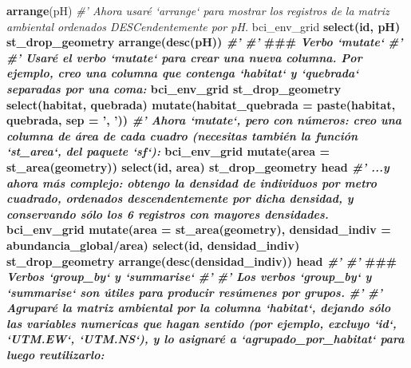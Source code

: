 \documentclass[11pt,]{article}
\newenvironment{Shaded}{\begin{snugshade}}{\end{snugshade}}
\newcommand{\KeywordTok}[1]{\textcolor[rgb]{0.13,0.29,0.53}{\textbf{#1}}}
\newcommand{\DataTypeTok}[1]{\textcolor[rgb]{0.13,0.29,0.53}{#1}}
\newcommand{\StringTok}[1]{\textcolor[rgb]{0.31,0.60,0.02}{#1}}
\newcommand{\CommentTok}[1]{\textcolor[rgb]{0.56,0.35,0.01}{\textit{#1}}}
\newcommand{\OperatorTok}[1]{\textcolor[rgb]{0.81,0.36,0.00}{\textbf{#1}}}
\newcommand{\AlertTok}[1]{\textcolor[rgb]{0.94,0.16,0.16}{#1}}
\newcommand{\NormalTok}[1]{#1}
\begin{document}
\begin{Shaded}
\begin{Highlighting}[]
{{{{{{{{{{{{{{{{{{{{{{{{{{{{{{{\StringTok{  }\KeywordTok{arrange}\NormalTok{(pH)}
\CommentTok{#' Ahora usaré `arrange` para mostrar los registros de la matriz ambiental ordenados DESCendentemente por pH.}
\NormalTok{bci_env_grid }\OperatorTok{%
\StringTok{  }\KeywordTok{select}\NormalTok{(id, pH) }\OperatorTok{%
\StringTok{  }\NormalTok{st_drop_geometry }\OperatorTok{%
\StringTok{  }\KeywordTok{arrange}\NormalTok{(}\KeywordTok{desc}\NormalTok{(pH))}
\CommentTok{#' }
\CommentTok{#' }\AlertTok{###}\CommentTok{ Verbo `mutate`}
\CommentTok{#' }
\CommentTok{#' Usaré el verbo `mutate` para crear una nueva columna. Por ejemplo, creo una columna que contenga `habitat` y `quebrada` separadas por una coma:}
\NormalTok{bci_env_grid }\OperatorTok{%
\StringTok{  }\NormalTok{st_drop_geometry }\OperatorTok{%
\StringTok{  }\KeywordTok{select}\NormalTok{(habitat, quebrada) }\OperatorTok{%
\StringTok{  }\KeywordTok{mutate}\NormalTok{(}\DataTypeTok{habitat_quebrada =} \KeywordTok{paste}\NormalTok{(habitat, quebrada, }\DataTypeTok{sep =} \StringTok{', '}\NormalTok{))}
\CommentTok{#' Ahora `mutate`, pero con números: creo una columna de área de cada cuadro (necesitas también la función `st_area`, del paquete `sf`):}
\NormalTok{bci_env_grid }\OperatorTok{%
\StringTok{  }\KeywordTok{mutate}\NormalTok{(}\DataTypeTok{area =} \KeywordTok{st_area}\NormalTok{(geometry)) }\OperatorTok{%
\StringTok{  }\KeywordTok{select}\NormalTok{(id, area) }\OperatorTok{%
\StringTok{  }\NormalTok{st_drop_geometry }\OperatorTok{%
\StringTok{  }\NormalTok{head}
\CommentTok{#' ...y ahora más complejo: obtengo la densidad de individuos por metro cuadrado, ordenados descendentemente por dicha densidad, y conservando sólo los 6 registros con mayores densidades.}
\NormalTok{bci_env_grid }\OperatorTok{%
\StringTok{  }\KeywordTok{mutate}\NormalTok{(}\DataTypeTok{area =} \KeywordTok{st_area}\NormalTok{(geometry), }\DataTypeTok{densidad_indiv =}\NormalTok{ abundancia_global}\OperatorTok{/}\NormalTok{area) }\OperatorTok{%
\StringTok{  }\KeywordTok{select}\NormalTok{(id, densidad_indiv) }\OperatorTok{%
\StringTok{  }\NormalTok{st_drop_geometry }\OperatorTok{%
\StringTok{  }\KeywordTok{arrange}\NormalTok{(}\KeywordTok{desc}\NormalTok{(densidad_indiv)) }\OperatorTok{%
\StringTok{  }\NormalTok{head}
\CommentTok{#' }
\CommentTok{#' }\AlertTok{###}\CommentTok{ Verbos `group_by` y `summarise`}
\CommentTok{#' }
\CommentTok{#' Los verbos `group_by` y `summarise` son útiles para producir resúmenes por grupos.}
\CommentTok{#' }
\CommentTok{#' Agruparé la matriz ambiental por la columna `habitat`, dejando sólo las variables numericas que hagan sentido (por ejemplo, excluyo `id`, `UTM.EW`, `UTM.NS`), y lo asignaré a `agrupado_por_habitat` para luego reutilizarlo:}
}}}}}}}}}}}}}}}}}}}}}}}}}}}}}}}}}}}}}}}}}}}}}}
\end{Highlighting}
\end{Shaded}
\end{document}
